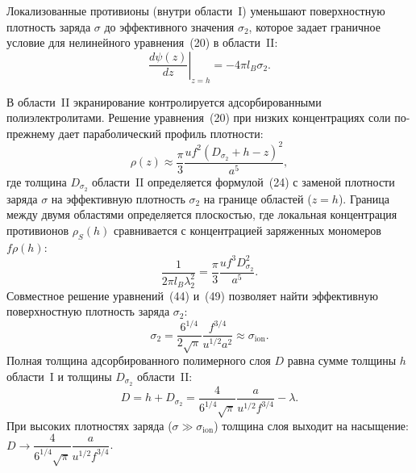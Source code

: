 \documentclass[12pt,a4paper]{article}
\begin{document}
Локализованные противионы (внутри области~I) уменьшают поверхностную плотность заряда $\sigma$ до эффективного значения $\sigma_2$, которое задает граничное условие для нелинейного уравнения~(20) в области~II:
\begin{equation}
\left.\frac{d\psi(z)}{dz}\right|_{z=h} = -4\pi l_B \sigma_2.
\end{equation}

В области~II экранирование контролируется адсорбированными полиэлектролитами. Решение уравнения~(20) при низких концентрациях соли по-прежнему дает параболический профиль плотности:
\begin{equation}
\rho(z) \approx \frac{\pi}{3}\frac{u f^2 (D_{\sigma_2} + h - z)^2}{a^5},
\end{equation}
где толщина $D_{\sigma_2}$ области~II определяется формулой~(24) с заменой плотности заряда $\sigma$ на эффективную плотность $\sigma_2$ на границе областей ($z = h$). Граница между двумя областями определяется плоскостью, где локальная концентрация противионов $\rho_S(h)$ сравнивается с концентрацией заряженных мономеров $f\rho(h)$:
\begin{equation}
\frac{1}{2\pi l_B \lambda_2^2} = \frac{\pi}{3}\frac{u f^3 D_{\sigma_2}^2}{a^5}.
\end{equation}
Совместное решение уравнений~(44) и~(49) позволяет найти эффективную поверхностную плотность заряда $\sigma_2$:
\begin{equation}
\sigma_2 = \frac{6^{1/4}}{2\sqrt{\pi}} \frac{f^{3/4}}{u^{1/2} a^2} \approx \sigma_{\text{ion}}.
\end{equation}
Полная толщина адсорбированного полимерного слоя $D$ равна сумме толщины $h$ области~I и толщины $D_{\sigma_2}$ области~II:
\begin{equation}
D = h + D_{\sigma_2} = \frac{4}{6^{1/4}\sqrt{\pi}} \frac{a}{u^{1/2} f^{3/4}} - \lambda.
\end{equation}
При высоких плотностях заряда ($\sigma \gg \sigma_{\text{ion}}$) толщина слоя выходит на насыщение: $D \to \dfrac{4}{6^{1/4}\sqrt{\pi}} \dfrac{a}{u^{1/2} f^{3/4}}$.
\end{document}

